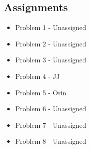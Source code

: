 \documentclass{article}
\begin{document}
\subsection*{Assignments}
\begin{itemize}
	\item Problem 1 - Unassigned
	\item Problem 2 - Unassigned
	\item Problem 3 - Unassigned
	\item Problem 4 - JJ
	\item Problem 5 - Orin
	\item Problem 6 - Unassigned
	\item Problem 7 - Unassigned
	\item Problem 8 - Unassigned
\end{itemize}
\end{document}
